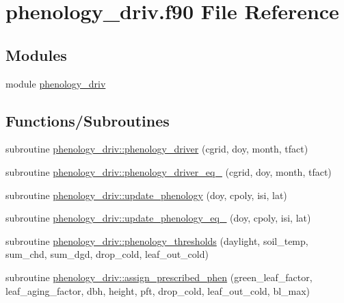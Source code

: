\hypertarget{phenology__driv_8f90}{}\section{phenology\+\_\+driv.\+f90 File Reference}
\label{phenology__driv_8f90}
\subsection*{Modules}
\begin{DoxyCompactItemize}
\item 
module \hyperlink{namespacephenology__driv}{phenology\+\_\+driv}
\end{DoxyCompactItemize}
\subsection*{Functions/\+Subroutines}
\begin{DoxyCompactItemize}
\item 
subroutine \hyperlink{namespacephenology__driv_aa94bafee9e386ab4060a515ce8187ba9}{phenology\+\_\+driv\+::phenology\+\_\+driver} (cgrid, doy, month, tfact)
\item 
subroutine \hyperlink{namespacephenology__driv_ad9990edb604600188e59eb7292caa613}{phenology\+\_\+driv\+::phenology\+\_\+driver\+\_\+eq\+\_} (cgrid, doy, month, tfact)
\item 
subroutine \hyperlink{namespacephenology__driv_a1b08d4597d08eba521c381a2b33147b5}{phenology\+\_\+driv\+::update\+\_\+phenology} (doy, cpoly, isi, lat)
\item 
subroutine \hyperlink{namespacephenology__driv_a3345cbd923a6af990fe1037ff4fc33e4}{phenology\+\_\+driv\+::update\+\_\+phenology\+\_\+eq\+\_} (doy, cpoly, isi, lat)
\item 
subroutine \hyperlink{namespacephenology__driv_a3b7effaca821bcbe2bf027b0032355aa}{phenology\+\_\+driv\+::phenology\+\_\+thresholds} (daylight, soil\+\_\+temp, sum\+\_\+chd, sum\+\_\+dgd, drop\+\_\+cold, leaf\+\_\+out\+\_\+cold)
\item 
subroutine \hyperlink{namespacephenology__driv_ac6132bf0f6e18f2a2dbcda5f93af5851}{phenology\+\_\+driv\+::assign\+\_\+prescribed\+\_\+phen} (green\+\_\+leaf\+\_\+factor, leaf\+\_\+aging\+\_\+factor, dbh, height, pft, drop\+\_\+cold, leaf\+\_\+out\+\_\+cold, bl\+\_\+max)
\end{DoxyCompactItemize}
